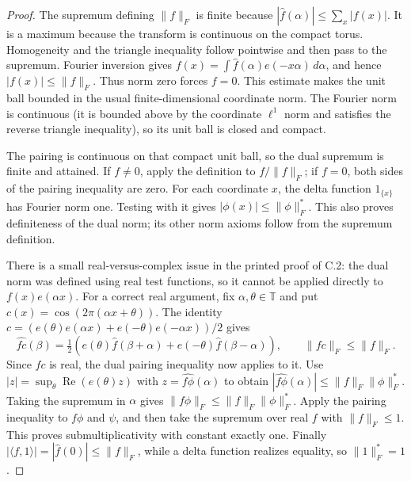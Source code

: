 \begin{proof}
The supremum defining $\|f\|_F$ is finite because
$|\widehat f(\alpha)|\leq\sum_x|f(x)|$.  It is a maximum because the
transform is continuous on the compact torus.  Homogeneity and the triangle
inequality follow pointwise and then pass to the supremum.
Fourier inversion gives
$f(x)=\int\widehat f(\alpha)e(-x\alpha)\,d\alpha$, and hence
$|f(x)|\leq\|f\|_F$.  Thus norm zero forces $f=0$.
This estimate makes the unit ball bounded in the usual finite-dimensional
coordinate norm.  The Fourier norm is continuous (it is bounded above by
the coordinate $\ell^1$ norm and satisfies the reverse triangle inequality),
so its unit ball is closed and compact.

The pairing is continuous on that compact unit ball, so the dual supremum
is finite and attained.  If $f\ne0$, apply the definition to
$f/\|f\|_F$; if $f=0$, both sides of the pairing inequality are zero.
For each coordinate $x$, the delta function $1_{\{x\}}$ has Fourier norm
one.  Testing with it gives $|\phi(x)|\leq\|\phi\|_F^*$.
This also proves definiteness of the dual norm; its other norm axioms
follow from the supremum definition.

There is a small real-versus-complex issue in the printed proof of C.2:
the dual norm was defined using real test functions, so it cannot be applied
directly to $f(x)e(\alpha x)$.
For a correct real argument, fix $\alpha,\theta\in\mathbb T$ and put
$c(x)=\cos(2\pi(\alpha x+\theta))$.
The identity $c=(e(\theta)e(\alpha x)+e(-\theta)e(-\alpha x))/2$ gives
\[
 \widehat{fc}(\beta)=\tfrac12\left(
 e(\theta)\widehat f(\beta+\alpha)
 +e(-\theta)\widehat f(\beta-\alpha)\right),
 \qquad \|fc\|_F\leq\|f\|_F.
\]
Since $fc$ is real, the dual pairing inequality now applies to it.
Use $|z|=\sup_\theta\operatorname{Re}(e(\theta)z)$ with
$z=\widehat{f\phi}(\alpha)$ to obtain
$|\widehat{f\phi}(\alpha)|\leq\|f\|_F\|\phi\|_F^*$.
Taking the supremum in $\alpha$ gives
$\|f\phi\|_F\leq\|f\|_F\|\phi\|_F^*$.
Apply the pairing inequality to $f\phi$ and $\psi$, and then take the
supremum over real $f$ with $\|f\|_F\leq1$.  This proves
submultiplicativity with constant exactly one.
Finally $|\langle f,1\rangle|=|\widehat f(0)|\leq\|f\|_F$, while a delta
function realizes equality, so $\|1\|_F^*=1$.
\end{proof}


